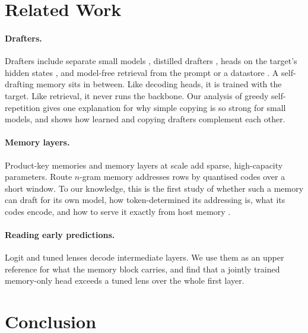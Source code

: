 \documentclass[11pt]{article}
\begin{document}
\section{Related Work}
\label{sec:related}

\paragraph{Drafters.}
Drafters include separate small models \citep{leviathan2023fast,chen2023accelerating}, distilled drafters
\citep{zhou2024distillspec}, heads on the target's hidden states \citep{stern2018blockwise,cai2024medusa,li2024eagle},
and model-free retrieval from the prompt or a datastore \citep{saxena2023pld,he2024rest,fu2024lookahead}. A self-drafting
memory sits in between. Like decoding heads, it is trained with the target. Like retrieval, it never runs the backbone.
Our analysis of greedy self-repetition gives one explanation for why simple copying is so strong for small models, and
shows how learned and copying drafters complement each other.

\paragraph{Memory layers.}
Product-key memories \citep{lample2019pkm} and memory layers at scale \citep{berges2024memory} add sparse, high-capacity
parameters. Route $n$-gram memory \citep{lngram} addresses rows by quantised codes over a short window. To our knowledge,
this is the first study of whether such a memory can draft for its own model, how token-determined its addressing is, what
its codes encode, and how to serve it exactly from host memory \citep[cf.][]{sheng2023flexgen}.

\paragraph{Reading early predictions.}
Logit and tuned lenses \citep{nostalgebraist2020logitlens,belrose2023tuned} decode intermediate layers. We use them as an
upper reference for what the memory block carries, and find that a jointly trained memory-only head exceeds a tuned lens
over the whole first layer.

\section{Conclusion}
\end{document}
